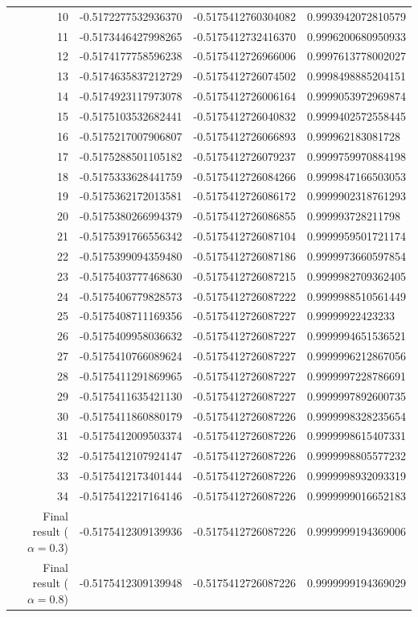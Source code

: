 \documentclass[10pt,twoside]{report}
\begin{document}
\begin{table}
\begin{tabular}{rlll}
			10 & -0.5172277532936370 & -0.5175412760304082 & 0.9993942072810579\\
			11 & -0.5173446427998265 & -0.5175412732416370 & 0.9996200680950933\\
			12 & -0.5174177758596238 & -0.5175412726966006 & 0.9997613778002027\\
			13 & -0.5174635837212729 & -0.5175412726074502 & 0.9998498885204151\\
			14 & -0.5174923117973078 & -0.5175412726006164 & 0.9999053972969874\\
			15 & -0.5175103532682441 & -0.5175412726040832 & 0.9999402572558445\\
			16 & -0.5175217007906807 & -0.5175412726066893 & 0.999962183081728\\
			17 & -0.5175288501105182 & -0.5175412726079237 & 0.9999759970884198\\
			18 & -0.5175333628441759 & -0.5175412726084266 & 0.9999847166503053\\
			19 & -0.5175362172013581 & -0.5175412726086172 & 0.9999902318761293\\
			20 & -0.5175380266994379 & -0.5175412726086855 & 0.999993728211798\\
			21 & -0.5175391766556342 & -0.5175412726087104 & 0.9999959501721174\\
			22 & -0.5175399094359480 & -0.5175412726087186 & 0.9999973660597854\\
			23 & -0.5175403777468630 & -0.5175412726087215 & 0.9999982709362405\\
			24 & -0.5175406779828573 & -0.5175412726087222 & 0.9999988510561449\\
			25 & -0.5175408711169356 & -0.5175412726087227 & 0.99999922423233\\
			26 & -0.5175409958036632 & -0.5175412726087227 & 0.9999994651536521\\
			27 & -0.5175410766089624 & -0.5175412726087227 & 0.9999996212867056\\
			28 & -0.5175411291869965 & -0.5175412726087227 & 0.9999997228786691\\
			29 & -0.5175411635421130 & -0.5175412726087227 & 0.9999997892600735\\
			30 & -0.5175411860880179 & -0.5175412726087226 & 0.9999998328235654\\
			31 & -0.5175412009503374 & -0.5175412726087226 & 
			0.9999998615407331\\
			32 & -0.5175412107924147 & -0.5175412726087226 & 0.9999998805577232\\
			33 & -0.5175412173401444 & -0.5175412726087226 & 0.9999998932093319\\
			34 & -0.5175412217164146 & -0.5175412726087226 & 0.9999999016652183\\ \hline
			Final result ($\alpha=0.3$) & -0.5175412309139936 & -0.5175412726087226 & 0.9999999194369006\\ \hline
			Final result ($\alpha=0.8$) & -0.5175412309139948 & -0.5175412726087226 &  0.9999999194369029
		\end{tabular}
		\label{Results | table | CCDT-1 iteration comparisons}
	\end{table}
	\newpage
\end{document}
